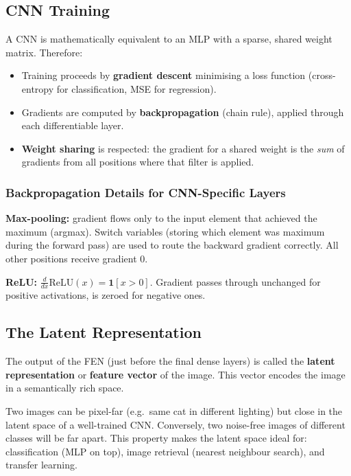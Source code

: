 \documentclass[11pt,a4paper]{article}
\newcommand{\term}[1]{\textcolor{DefGreen}{\textbf{#1}}}
\begin{document}
\subsection{CNN Training}

A CNN is mathematically equivalent to an MLP with a sparse, shared weight matrix. Therefore:
\begin{itemize}
  \item Training proceeds by \textbf{gradient descent} minimising a loss function (cross-entropy for classification, MSE for regression).
  \item Gradients are computed by \textbf{backpropagation} (chain rule), applied through each differentiable layer.
  \item \textbf{Weight sharing} is respected: the gradient for a shared weight is the \emph{sum} of gradients from all positions where that filter is applied.
\end{itemize}

\subsubsection{Backpropagation Details for CNN-Specific Layers}

\textbf{Max-pooling:} gradient flows only to the input element that achieved the maximum (argmax). Switch variables (storing which element was maximum during the forward pass) are used to route the backward gradient correctly. All other positions receive gradient 0.

\textbf{ReLU:} $\frac{d}{dx}\mathrm{ReLU}(x) = \mathbf{1}[x>0]$. Gradient passes through unchanged for positive activations, is zeroed for negative ones.

\subsection{The Latent Representation}
\label{sec:latent}

The output of the FEN (just before the final dense layers) is called the \term{latent representation} or \term{feature vector} of the image. This vector encodes the image in a semantically rich space.

\begin{insightbox}
Two images can be pixel-far (e.g.\ same cat in different lighting) but close in the latent space of a well-trained CNN. Conversely, two noise-free images of different classes will be far apart. This property makes the latent space ideal for: classification (MLP on top), image retrieval (nearest neighbour search), and transfer learning.
\end{insightbox}
\end{document}
